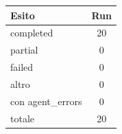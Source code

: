 \begin{tabularx}{\textwidth}{l S[table-format=3.0]}
  \toprule
  Esito & {Run} \\
  \midrule
  completed & 20 \\
  partial & 0 \\
  failed & 0 \\
  altro & 0 \\
  con agent\_errors & 0 \\
  totale & 20 \\
  \bottomrule
\end{tabularx}
